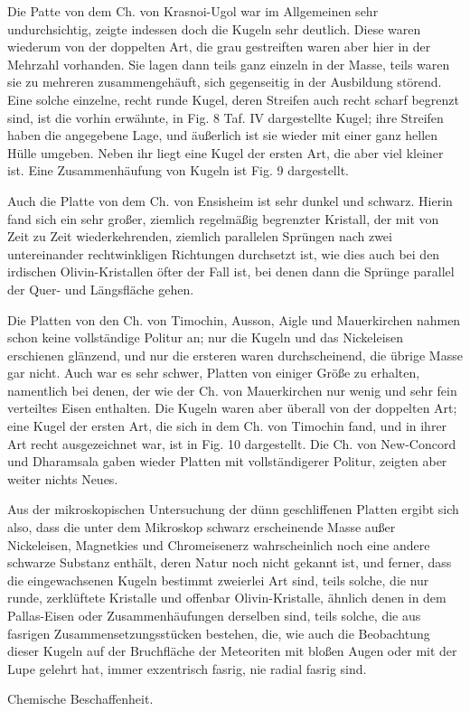 \documentclass[a4paper, 11pt, oneside]{article}
\begin{document}
Die Patte von dem Ch. von Krasnoi-Ugol war im Allgemeinen sehr undurchsichtig, zeigte indessen doch die Kugeln sehr deutlich. Diese waren wiederum von der doppelten Art, die grau gestreiften waren aber hier in der Mehrzahl vorhanden. Sie lagen dann teils ganz einzeln in der Masse, teils waren sie zu mehreren zusammengehäuft, sich gegenseitig in der Ausbildung störend. Eine solche einzelne, recht runde Kugel, deren Streifen auch recht scharf begrenzt sind, ist die vorhin erwähnte, in Fig. 8 Taf. IV dargestellte Kugel; ihre Streifen haben die angegebene Lage, und äußerlich ist sie wieder mit einer ganz hellen Hülle umgeben. Neben ihr liegt eine Kugel der ersten Art, die aber viel kleiner ist. Eine Zusammenhäufung von Kugeln ist Fig. 9 dargestellt.

Auch die Platte von dem Ch. von Ensisheim ist sehr dunkel und schwarz. Hierin fand sich ein sehr großer, ziemlich regelmäßig begrenzter Kristall, der mit von Zeit zu Zeit wiederkehrenden, ziemlich parallelen Sprüngen nach zwei untereinander rechtwinkligen Richtungen durchsetzt ist, wie dies auch bei den irdischen Olivin-Kristallen öfter der Fall ist, bei denen dann die Sprünge parallel der Quer- und Längsfläche gehen.

Die Platten von den Ch. von Timochin, Ausson, Aigle und Mauerkirchen nahmen schon keine vollständige Politur an; nur die Kugeln und das Nickeleisen erschienen glänzend, und nur die ersteren waren durchscheinend, die übrige Masse gar nicht. Auch war es sehr schwer, Platten von einiger Größe zu erhalten, namentlich bei denen, der wie der Ch. von Mauerkirchen nur wenig und sehr fein verteiltes Eisen enthalten. Die Kugeln waren aber überall von der doppelten Art; eine Kugel der ersten Art, die sich in dem Ch. von Timochin fand, und in ihrer Art recht ausgezeichnet war, ist in Fig. 10 dargestellt. Die Ch. von New-Concord und Dharamsala gaben wieder Platten mit vollständigerer Politur, zeigten aber weiter nichts Neues.

Aus der mikroskopischen Untersuchung der dünn geschliffenen Platten ergibt sich also, dass die unter dem Mikroskop schwarz erscheinende Masse außer Nickeleisen, Magnetkies und Chromeisenerz wahrscheinlich noch eine andere schwarze Substanz enthält, deren Natur noch nicht gekannt ist, und ferner, dass die eingewachsenen Kugeln bestimmt zweierlei Art sind, teils solche, die nur runde, zerklüftete Kristalle und offenbar Olivin-Kristalle, ähnlich denen in dem Pallas-Eisen oder Zusammenhäufungen derselben sind, teils solche, die aus fasrigen Zusammensetzungsstücken bestehen, die, wie auch die Beobachtung dieser Kugeln auf der Bruchfläche der Meteoriten mit bloßen Augen oder mit der Lupe gelehrt hat, immer exzentrisch fasrig, nie radial fasrig sind.
\begin{center}
Chemische Beschaffenheit.
\end{center}
\end{document}

